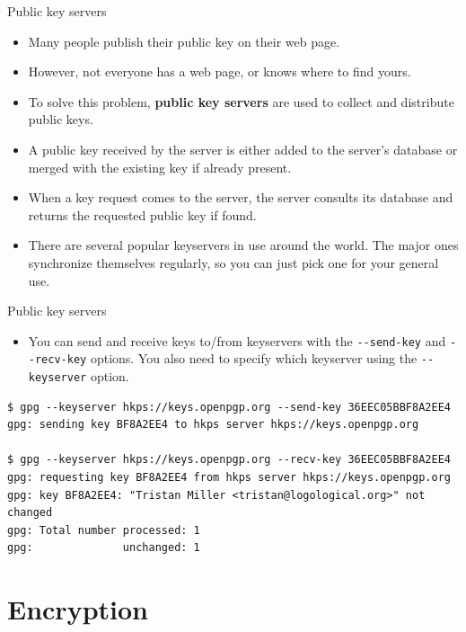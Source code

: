 \documentclass[
mode=present,
paper=smartboard,
size=20pt,
]{powerdot}
\newcommand{\clopt}[1]{\texttt{{-}#1}}
\begin{document}
\begin{slide}{Public key servers}
  \begin{itemize}
  \item Many people publish their public key on their web page.
  \item However, not everyone has a web page, or knows where to find
    yours.
  \item To solve this problem, \textbf{public key servers} are used to
    collect and distribute public keys.
  \item A public key received by the server is either added to the
    server's database or merged with the existing key if already
    present.
  \item When a key request comes to the server, the server consults
    its database and returns the requested public key if found.
  \item There are several popular keyservers in use around the world.
    The major ones synchronize themselves regularly, so you can just
    pick one for your general use.
  \end{itemize}
\end{slide}

\makeatletter\renewcommand{\verbatim@font}{\footnotesize\tt}\makeatother
\begin{slide}[method=direct,toc=]{Public key servers}
  \begin{itemize}
  \item You can send and receive keys to/from keyservers with the
    \clopt{-send-key} and \clopt{-recv-key} options.  You also need to
    specify which keyserver using the \clopt{-keyserver} option.
  \end{itemize}
\begin{verbatim}
$ gpg --keyserver hkps://keys.openpgp.org --send-key 36EEC05BBF8A2EE4
gpg: sending key BF8A2EE4 to hkps server hkps://keys.openpgp.org

$ gpg --keyserver hkps://keys.openpgp.org --recv-key 36EEC05BBF8A2EE4
gpg: requesting key BF8A2EE4 from hkps server hkps://keys.openpgp.org
gpg: key BF8A2EE4: "Tristan Miller <tristan@logological.org>" not changed
gpg: Total number processed: 1
gpg:              unchanged: 1
\end{verbatim}
\end{slide}

\section{Encryption}
\end{document}
